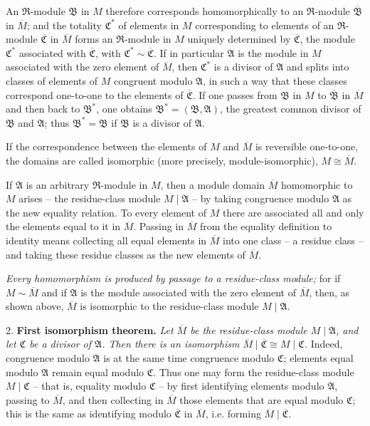 \documentclass[11pt]{article}
\providecommand{\mR}{\mathfrak{R}}
\providecommand{\mA}{\mathfrak{A}}
\providecommand{\mB}{\mathfrak{B}}
\providecommand{\mC}{\mathfrak{C}}
\begin{document}
An $\mR$-module $\mB$ in $M$ therefore corresponds homomorphically to an $\mR$-module $\overline{\mB}$ in $\overline M$; and the totality $\mC^*$ of elements in $M$ corresponding to elements of an $\mR$-module $\overline{\mC}$ in $\overline M$ forms an $\mR$-module in $M$ uniquely determined by $\overline{\mC}$, the module $\mC^*$ associated with $\overline{\mC}$, with $\mC^*\sim\overline{\mC}$. If in particular $\mA$ is the module in $M$ associated with the zero element of $\overline M$, then $\mC^*$ is a divisor of $\mA$ and splits into classes of elements of $M$ congruent modulo $\mA$, in such a way that these classes correspond one-to-one to the elements of $\overline{\mC}$. If one passes from $\mB$ in $M$ to $\overline{\mB}$ in $\overline M$ and then back to $\mB^*$, one obtains $\mB^*=(\mB,\mA)$, the greatest common divisor of $\mB$ and $\mA$; thus $\mB^*=\mB$ if $\mB$ is a divisor of $\mA$.

If the correspondence between the elements of $M$ and $\overline M$ is reversible one-to-one, the domains are called isomorphic (more precisely, module-isomorphic), $M\cong\overline M$.

If $\mA$ is an arbitrary $\mR$-module in $M$, then a module domain $\overline M$ homomorphic to $M$ arises -- the residue-class module $M\mid\mA$ -- by taking congruence modulo $\mA$ as the new equality relation. To every element of $M$ there are associated all and only the elements equal to it in $\overline M$. Passing in $\overline M$ from the equality definition to identity means collecting all equal elements in $\overline M$ into one class -- a residue class -- and taking these residue classes as the new elements of $\overline M$.

\emph{Every homomorphism is produced by passage to a residue-class module;} for if $M\sim\overline M$ and if $\mA$ is the module associated with the zero element of $\overline M$, then, as shown above, $\overline M$ is isomorphic to the residue-class module $M\mid\mA$.

2. \textbf{First isomorphism theorem.} \emph{Let $\overline M$ be the residue-class module $M\mid\mA$, and let $\mC$ be a divisor of $\mA$. Then there is an isomorphism $\overline M\mid\overline{\mC}\cong M\mid\mC$.} Indeed, congruence modulo $\mA$ is at the same time congruence modulo $\mC$; elements equal modulo $\mA$ remain equal modulo $\mC$. Thus one may form the residue-class module $M\mid\mC$ -- that is, equality modulo $\mC$ -- by first identifying elements modulo $\mA$, passing to $\overline M$, and then collecting in $\overline M$ those elements that are equal modulo $\mC$; this is the same as identifying modulo $\overline{\mC}$ in $\overline M$, i.e. forming $\overline M\mid\overline{\mC}$.
\end{document}
